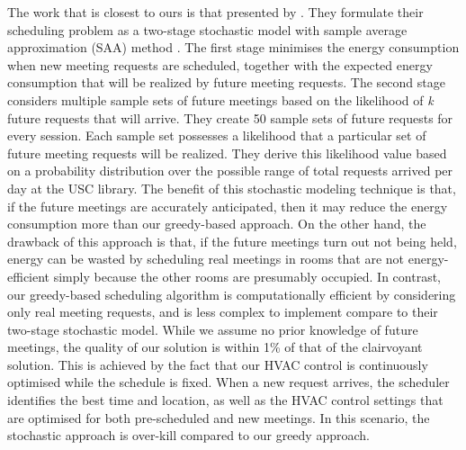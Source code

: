 The work that is closest to ours is that presented by \cite{kwak2013tesla}. They formulate their scheduling problem as a two-stage stochastic model with sample average approximation (SAA) method \citep{pagnoncelli2009sample}. The first stage minimises the energy consumption when new meeting requests are scheduled, together with the expected energy consumption that will be realized by future meeting requests. The second stage considers multiple sample sets of future meetings based on the likelihood of \emph{\textsl{k}} future requests that will arrive. They create 50 sample sets of future requests for every session. Each sample set possesses a likelihood that a particular set of future meeting requests will be realized. They derive this likelihood value based on a probability distribution over the possible range of total requests arrived per day at the USC library. 
The benefit of this stochastic modeling technique is that, if the future meetings are accurately anticipated, then it may reduce the energy consumption more than our greedy-based approach.
On the other hand, the drawback of this approach is that, if the future meetings turn out not being held, energy can be wasted by scheduling real meetings in rooms that are not energy-efficient simply because the other rooms are presumably occupied. 
In contrast, our greedy-based scheduling algorithm is computationally efficient by considering only real meeting requests, and is less complex to implement compare to their two-stage stochastic model. While we assume no prior knowledge of future meetings, the quality of our solution is within 1\% of that of the clairvoyant solution. This is achieved by the fact that our HVAC control is continuously optimised while the schedule is fixed. When a new request arrives, the scheduler identifies the best time and location, as well as the HVAC control settings that are optimised for both pre-scheduled and new meetings. In this scenario, the stochastic approach is over-kill compared to our greedy approach.


